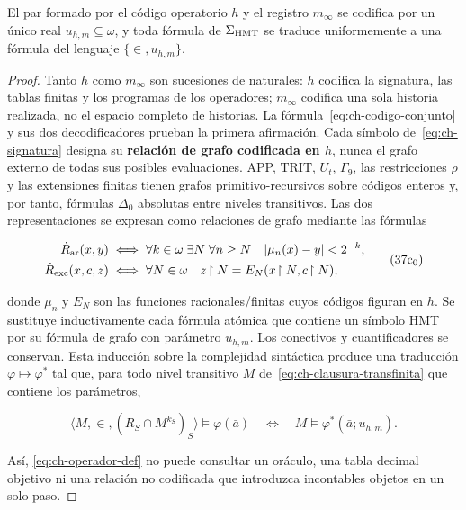 \begin{lemma}
\label{thm:ch-6}
El par formado por
el código operatorio \(h\) y el registro \(m_\infty\) se codifica por un único
real \(u_{h,m}\subseteq\omega\), y toda fórmula de \(\Sigma_{\rm HMT}\) se
traduce uniformemente a una fórmula del lenguaje \(\{\in,u_{h,m}\}\).

\end{lemma}
\begin{proof}
Tanto \(h\) como \(m_\infty\) son sucesiones de naturales: \(h\)
codifica la signatura, las tablas finitas y los programas de los operadores;
\(m_\infty\) codifica una sola historia realizada, no el espacio completo de
historias. La fórmula~\eqref{eq:ch-codigo-conjunto} y sus dos decodificadores prueban la primera
afirmación. Cada símbolo de~\eqref{eq:ch-signatura} designa su \textbf{relación de grafo codificada en \(h\)}, nunca el grafo externo de todas sus posibles evaluaciones. APP,
TRIT, \(U_t\), \(\Gamma_9\), las restricciones \(\rho\) y las extensiones
finitas tienen grafos primitivo-recursivos sobre códigos enteros y, por tanto,
fórmulas \(\Delta_0\) absolutas entre niveles transitivos. Las dos
representaciones se expresan como relaciones de grafo mediante las fórmulas

\[
 \begin{aligned}
 \dot R_{\rm ar}(x,y)
 &\;\Longleftrightarrow\;
 \forall k\in\omega\;\exists N\;\forall n\ge N\quad
 |\mu_n(x)-y|<2^{-k},\\
 \dot R_{\rm exc}(x,c,z)
 &\;\Longleftrightarrow\;
 \forall N\in\omega\quad z\!\upharpoonright N
   =E_N(x\!\upharpoonright N,c\!\upharpoonright N),
 \end{aligned}
\tag{37c$_0$}\label{eq:ch-grafos-publicacion}
\]

donde \(\mu_n\) y \(E_N\) son las funciones racionales/finitas cuyos códigos
figuran en \(h\). Se sustituye inductivamente cada fórmula atómica que contiene
un símbolo HMT por su fórmula de grafo con parámetro \(u_{h,m}\). Los
conectivos y cuantificadores se conservan. Esta inducción sobre la complejidad
sintáctica produce una traducción \(\varphi\mapsto\varphi^*\) tal que, para
todo nivel transitivo \(M\) de~\eqref{eq:ch-clausura-transfinita} que contiene los parámetros,

\[
 \langle M,\in,(\dot R_S\cap M^{k_S})_S\rangle
   \models\varphi(\bar a)
 \quad\Longleftrightarrow\quad
 M\models\varphi^*(\bar a;u_{h,m}).
\tag{37c}\label{eq:ch-eliminacion-uniforme}
\]

Así, \eqref{eq:ch-operador-def} no puede consultar un oráculo, una tabla decimal objetivo ni una
relación no codificada que introduzca incontables objetos en un solo paso.
\end{proof}

